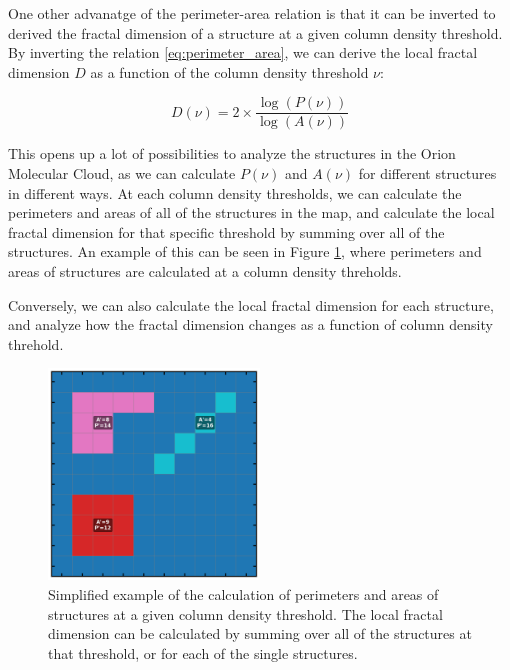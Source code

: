One other advanatge of the perimeter-area relation is that it can be inverted to derived the fractal dimension of a structure at a given column density threshold. By inverting the relation \ref{eq:perimeter_area}, we can derive the local fractal dimension $D$ as a function of the column density threshold $\nu$:

\begin{equation}
    \label{eq:local_fractal_dimension}
    D(\nu) = 2 \times \frac{\log(P(\nu))}{\log(A(\nu))}
\end{equation}

This opens up a lot of possibilities to analyze the structures in the Orion Molecular Cloud, as we can calculate $P(\nu)$ and $A(\nu)$ for different structures in different ways. At each column density thresholds, we can calculate the perimeters and areas of all of the structures in the map, and calculate the local fractal dimension for that specific threshold by summing over all of the structures. An example of this can be seen in Figure \ref{fig:local_fractal_dimension_example}, where perimeters and areas of structures are calculated at a column density threholds.

Conversely, we can also calculate the local fractal dimension for each structure, and analyze how the fractal dimension changes as a function of column density threhold.

\begin{figure}[t]
    \centering
    \includegraphics[width=0.5\textwidth]{figures/example_calculations.png}
    \caption{Simplified example of the calculation of perimeters and areas of structures at a given column density threshold. The local fractal dimension can be calculated by summing over all of the structures at that threshold, or for each of the single structures.}
    \label{fig:local_fractal_dimension_example}
\end{figure}

